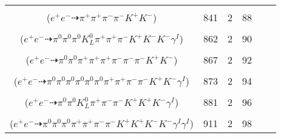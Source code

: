 \documentclass[landscape]{article}
\newcounter{rownumbers}
\newcommand\rn{\stepcounter{rownumbers}\arabic{rownumbers}}
\newcommand{\EOL}{\\} %
\newcommand{\topoTags}[1]{#1} %
\begin{document}
\begin{longtable}{clcccc}
\rn & \makecell[l]{ $ 
e^{+} e^{-} \rightarrow \pi^{+} \pi^{+} \pi^{-} K^{*} K^{-} ,
K^{*} \rightarrow \pi^{-} K^{+} 
$ \\ ($
e^{+} e^{-} \dashrightarrow \pi^{+} \pi^{+} \pi^{-} \pi^{-} K^{+} K^{-} 
$) } & \topoTags{841 & }2 & 88 \EOL

\rn & \makecell[l]{ $ 
e^{+} e^{-} \rightarrow \pi^{0} \pi^{+} \omega K^{*} K^{-} \phi \gamma^{I} ,
\omega \rightarrow \pi^{0} \pi^{+} \pi^{-} ,
K^{*} \rightarrow \pi^{0} K^{0} ,
\phi \rightarrow K^{+} K^{-} ,
K^{0} \rightarrow K_{L}^{0} 
$ \\ ($
e^{+} e^{-} \dashrightarrow \pi^{0} \pi^{0} \pi^{0} K_{L}^{0} \pi^{+} \pi^{+} \pi^{-} K^{+} K^{-} K^{-} \gamma^{I} 
$) } & \topoTags{862 & }2 & 90 \EOL

\rn & \makecell[l]{ $ 
e^{+} e^{-} \rightarrow \pi^{0} \rho^{0} \pi^{+} \omega K^{*} K^{-} ,
\rho^{0} \rightarrow \pi^{+} \pi^{-} ,
\omega \rightarrow \pi^{0} \pi^{+} \pi^{-} ,
K^{*} \rightarrow \pi^{-} K^{+} 
$ \\ ($
e^{+} e^{-} \dashrightarrow \pi^{0} \pi^{0} \pi^{+} \pi^{+} \pi^{+} \pi^{-} \pi^{-} \pi^{-} K^{+} K^{-} 
$) } & \topoTags{867 & }2 & 92 \EOL

\rn & \makecell[l]{ $ 
e^{+} e^{-} \rightarrow \pi^{0} \pi^{0} \pi^{0} \pi^{-} \rho^{+} \eta K^{-} K^{*+} \gamma^{I} ,
\rho^{+} \rightarrow \pi^{0} \pi^{+} ,
\eta \rightarrow \pi^{0} \pi^{+} \pi^{-} ,
K^{*+} \rightarrow \pi^{0} K^{+} 
$ \\ ($
e^{+} e^{-} \dashrightarrow \pi^{0} \pi^{0} \pi^{0} \pi^{0} \pi^{0} \pi^{0} \pi^{+} \pi^{+} \pi^{-} \pi^{-} K^{+} K^{-} \gamma^{I} 
$) } & \topoTags{873 & }2 & 94 \EOL

\rn & \makecell[l]{ $ 
e^{+} e^{-} \rightarrow \pi^{+} \pi^{-} \pi^{-} \bar{K}^{*} K^{+} K^{-} K^{*+} \gamma^{I} ,
\bar{K}^{*} \rightarrow \pi^{0} \bar{K}^{0} ,
K^{*+} \rightarrow \pi^{0} K^{+} ,
\bar{K}^{0} \rightarrow K_{L}^{0} 
$ \\ ($
e^{+} e^{-} \dashrightarrow \pi^{0} \pi^{0} K_{L}^{0} \pi^{+} \pi^{-} \pi^{-} K^{+} K^{+} K^{-} \gamma^{I} 
$) } & \topoTags{881 & }2 & 96 \EOL

\rn & \makecell[l]{ $ 
e^{+} e^{-} \rightarrow \pi^{0} \pi^{+} \pi^{-} \rho^{+} K^{*} K^{+} K^{-} K^{*-} \gamma^{I} \gamma^{I} ,
\rho^{+} \rightarrow \pi^{0} \pi^{+} ,
K^{*} \rightarrow \pi^{-} K^{+} ,
K^{*-} \rightarrow \pi^{0} K^{-} 
$ \\ ($
e^{+} e^{-} \dashrightarrow \pi^{0} \pi^{0} \pi^{0} \pi^{+} \pi^{+} \pi^{-} \pi^{-} K^{+} K^{+} K^{-} K^{-} \gamma^{I} \gamma^{I} 
$) } & \topoTags{911 & }2 & 98 \EOL


\end{longtable}
\end{document}
